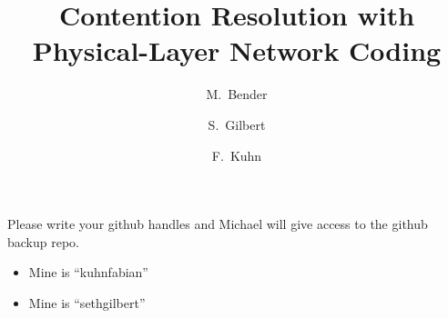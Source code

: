 \documentclass[11pt]{article}
\begin{document}
\title{Contention Resolution with Physical-Layer Network Coding}

\author{M.\ Bender \and S.\ Gilbert \and F.\ Kuhn}
\maketitle

Please write your github handles and Michael will give access to the github backup repo.

\begin{itemize}
    \item Mine is ``kuhnfabian''
    \item Mine is ``sethgilbert''
\end{itemize}













\end{document}

